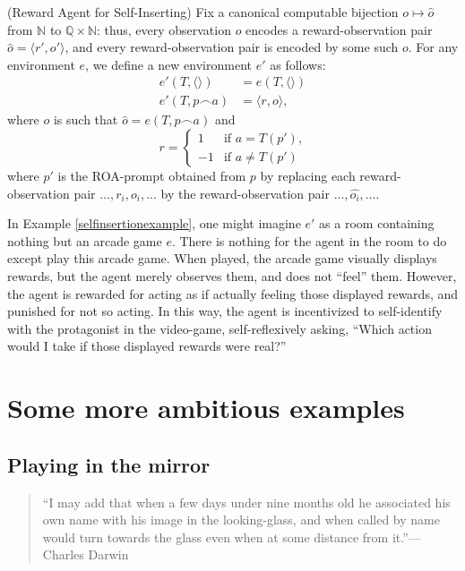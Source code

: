\documentclass[runningheads]{llncs}
\begin{document}
\begin{example}
\label{selfinsertionexample}
    (Reward Agent for Self-Inserting)
    Fix a canonical computable bijection
    $o\mapsto \hat o$
    from $\mathbb N$ to $\mathbb Q\times \mathbb N$:
    thus, every observation $o$ encodes a reward-observation pair
    $\hat o = \langle r',o'\rangle$, and every reward-observation pair
    is encoded by some such $o$.
    For any environment $e$, we define
    a new environment $e'$ as follows:
    \begin{align*}
        e'(T,\langle\rangle) &= e(T,\langle\rangle)\\
        e'(T,p\frown a) &= \langle r,o\rangle,
    \end{align*}
    where $o$ is such that $\hat o = e(T,p\frown a)$ and
    \[
        r =
        \begin{cases}
            1 & \mbox{if $a=T(p')$,}\\
            -1 & \mbox{if $a\not=T(p')$}
        \end{cases}
    \]
    where
    $p'$ is the ROA-prompt obtained from $p$
    by replacing each reward-observation pair
    $\ldots,r_i,o_i,\ldots$ by the reward-observation
    pair $\ldots,\widehat{o_i},\ldots$.
\end{example}

In Example \ref{selfinsertionexample}, one might imagine $e'$ as a room containing nothing
but an arcade game $e$. There is nothing for the agent in the room to do
except play this arcade game.
When played, the arcade game
visually displays rewards, but the agent merely observes them, and does not
``feel'' them. However, the agent is rewarded for acting as if actually feeling
those displayed rewards, and punished for not so acting.
In this way, the agent is incentivized
to self-identify with the protagonist in the video-game, self-reflexively asking,
``Which action would I take if those displayed rewards were real?''


\section{Some more ambitious examples}

\subsection{Playing in the mirror}

\begin{quote}
    ``I may add that when a few days under nine months old he associated his own name with
    his image in the looking-glass, and when called by name would turn towards the glass
    even when at some distance from it.''---Charles Darwin \cite{darwin1877biographical}
\end{quote}
\end{document}
